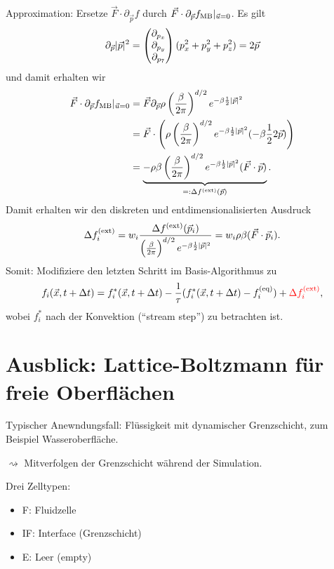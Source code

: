 Approximation: Ersetze $\vec{F} \cdot \partial_{\vec{p}} f$ durch $\vec{F} \cdot
\partial_{\vec{p}} f_{\operatorname{MB}} |_{\vec{u}=0}$. Es gilt
\[ \partial_{\vec{p}} |\vec{p}|^2 =
  \begin{pmatrix}\partial_{p_x} \\ \partial_{p_y} \\ \partial_{p_7}\end{pmatrix}
  (p_x^2 + p_y^2 + p_z^2)
  = 2 \vec{p} \]
und damit erhalten wir
\[ \begin{aligned}
    \vec{F} \cdot \partial_{\vec{p}} f_{\operatorname{MB}} |_{\vec{u}=0}
    &= \vec{F} \partial_{\vec{p}} \rho \left( \frac{\beta}{2\pi} \right)^{d/2}
    e^{-\beta \frac{1}{2} |\vec{p}|^2} \\
    &= \vec{F} \cdot \left(  \rho \left( \frac{\beta}{2\pi} \right)^{d/2}
      e^{-\beta \frac{1}{2} |\vec{p}|^2} (-\beta \frac{1}{2} 2 \vec{p})
    \right) \\
    &= \underbrace{
      - \rho \beta \left( \frac{\beta}{2\pi} \right)^{d/2}
      e^{-\beta \frac{1}{2} |\vec{p}|^2} (\vec{F} \cdot \vec{p})
      }_{=: \Delta f^{(\text{ext})}(\vec{p})}.
  \end{aligned}
\]
Damit erhalten wir den diskreten und entdimensionalisierten Ausdruck
\[ \Delta f_i^{(\text{ext})} = w_i \frac{\Delta f^{(\text{ext})}(\vec{p}_i)}
  {\left( \frac{\beta}{2\pi} \right)^{d/2} e^{-\beta \frac{1}{2} |\vec{p}|^2}}
  = w_i \rho \beta ( \vec{F} \cdot \vec{p}_i ). \]
Somit: Modifiziere den letzten Schritt im Basis-Algorithmus zu
\[ f_i(\vec{x}, t + \Delta t) = f_i^*(\vec{x},t + \Delta t) - \frac{1}{\tau}( f_i^*
  (\vec{x}, t + \Delta t) -f_i^{(\text{eq})})
  + {\color{red} \Delta f_i^{(\text{ext})}}, \]
wobei $f_i^*$ nach der Konvektion (``stream step'') zu betrachten ist.

\section*{Ausblick: Lattice-Boltzmann für freie Oberflächen}
Typischer Anewndungsfall: Flüssigkeit mit dynamischer Grenzschicht, zum Beispiel
Wasseroberfläche.

$\rightsquigarrow$ Mitverfolgen der Grenzschicht während der Simulation.


Drei Zelltypen:
\begin{itemize}
\item F: Fluidzelle
\item IF: Interface (Grenzschicht)
\item E: Leer (empty)
\end{itemize}

